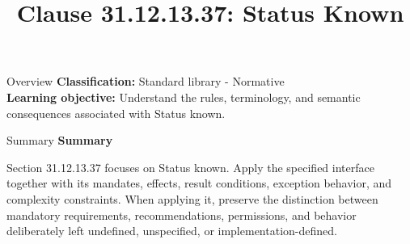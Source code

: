 \documentclass[10pt,letterpaper]{article}
\title{Clause 31.12.13.37: Status Known}
\author{}
\date{}
\begin{document}
\maketitle
\begin{CornellOverviewBox}{Overview}
\textbf{Classification:} Standard library - Normative\\[2pt]
\textbf{Learning objective:} Understand the rules, terminology, and semantic consequences associated with Status known.
\end{CornellOverviewBox}\begin{CornellSummaryBox}{Summary}
{\sffamily\bfseries\color{Accent} Summary}\par\vspace{3pt}Section 31.12.13.37 focuses on Status known. Apply the specified interface together with its mandates, effects, result conditions, exception behavior, and complexity constraints. When applying it, preserve the distinction between mandatory requirements, recommendations, permissions, and behavior deliberately left undefined, unspecified, or implementation-defined.
\end{CornellSummaryBox}
\end{document}
